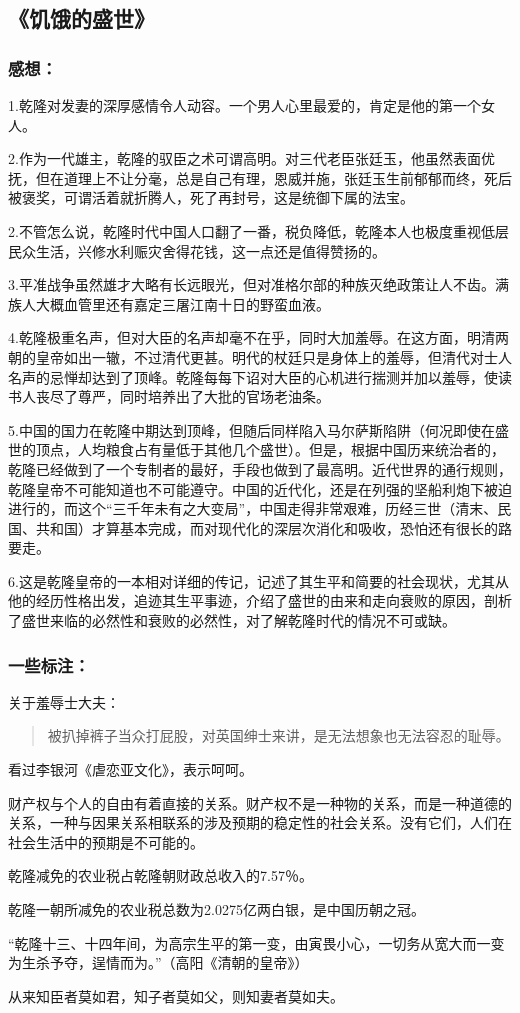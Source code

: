 \subsection{《饥饿的盛世》}

\subsubsection{感想：}
1.乾隆对发妻的深厚感情令人动容。一个男人心里最爱的，肯定是他的第一个女人。

2.作为一代雄主，乾隆的驭臣之术可谓高明。对三代老臣张廷玉，他虽然表面优抚，但在道理上不让分毫，总是自己有理，恩威并施，张廷玉生前郁郁而终，死后被褒奖，可谓活着就折腾人，死了再封号，这是统御下属的法宝。

2.不管怎么说，乾隆时代中国人口翻了一番，税负降低，乾隆本人也极度重视低层民众生活，兴修水利赈灾舍得花钱，这一点还是值得赞扬的。 

3.平准战争虽然雄才大略有长远眼光，但对准格尔部的种族灭绝政策让人不齿。满族人大概血管里还有嘉定三屠江南十日的野蛮血液。 

4.乾隆极重名声，但对大臣的名声却毫不在乎，同时大加羞辱。在这方面，明清两朝的皇帝如出一辙，不过清代更甚。明代的杖廷只是身体上的羞辱，但清代对士人名声的忌惮却达到了顶峰。乾隆每每下诏对大臣的心机进行揣测并加以羞辱，使读书人丧尽了尊严，同时培养出了大批的官场老油条。 

5.中国的国力在乾隆中期达到顶峰，但随后同样陷入马尔萨斯陷阱（何况即使在盛世的顶点，人均粮食占有量低于其他几个盛世）。但是，根据中国历来统治者的，乾隆已经做到了一个专制者的最好，手段也做到了最高明。近代世界的通行规则，乾隆皇帝不可能知道也不可能遵守。中国的近代化，还是在列强的坚船利炮下被迫进行的，而这个“三千年未有之大变局”，中国走得非常艰难，历经三世（清末、民国、共和国）才算基本完成，而对现代化的深层次消化和吸收，恐怕还有很长的路要走。 

6.这是乾隆皇帝的一本相对详细的传记，记述了其生平和简要的社会现状，尤其从他的经历性格出发，追迹其生平事迹，介绍了盛世的由来和走向衰败的原因，剖析了盛世来临的必然性和衰败的必然性，对了解乾隆时代的情况不可或缺。

\subsubsection{一些标注：}
关于羞辱士大夫：
\begin{quotation}
被扒掉裤子当众打屁股，对英国绅士来讲，是无法想象也无法容忍的耻辱。
\end{quotation}
看过李银河《虐恋亚文化》，表示呵呵。

财产权与个人的自由有着直接的关系。财产权不是一种物的关系，而是一种道德的关系，一种与因果关系相联系的涉及预期的稳定性的社会关系。没有它们，人们在社会生活中的预期是不可能的。

乾隆减免的农业税占乾隆朝财政总收入的7.57％。

乾隆一朝所减免的农业税总数为2.0275亿两白银，是中国历朝之冠。

“乾隆十三、十四年间，为高宗生平的第一变，由寅畏小心，一切务从宽大而一变为生杀予夺，逞情而为。”（高阳《清朝的皇帝》）

从来知臣者莫如君，知子者莫如父，则知妻者莫如夫。